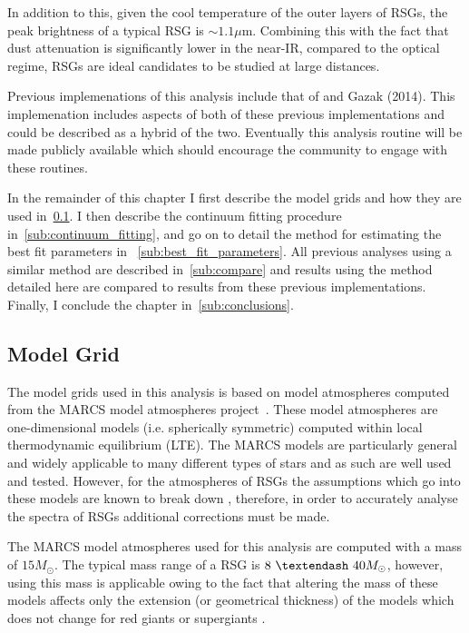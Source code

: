 In addition to this, given the cool temperature of the outer layers of RSGs,
the peak brightness of a typical RSG is $\sim1.1\mu$m.
Combining this with the fact that dust attenuation is significantly lower in the near-IR, compared to the optical regime, RSGs are ideal candidates to be studied at large distances.

Previous implemenations of this analysis include that of
\cite{2010MNRAS.407.1203D} and Gazak (2014).
This implemenation includes aspects of both of these previous implementations and could be described as a hybrid of the two.
Eventually this analysis routine will be made publicly available which should encourage the community to engage with these routines.

In the remainder of this chapter I first describe the model grids and how they are used in~\ref{sub:model_grid}.
I then describe the continuum fitting procedure in~\ref{sub:continuum_fitting},
and go on to detail the method for estimating the best fit parameters in
~\ref{sub:best_fit_parameters}.
All previous analyses using a similar method are described in~\ref{sub:compare}
and results using the method detailed here are compared to results from these previous implementations.
Finally, I conclude the chapter in~\ref{sub:conclusions}.


\subsection{Model Grid} %
\label{sub:model_grid}
The model grids used in this analysis is based on model atmospheres computed from the
MARCS model atmospheres project~\citep{2008A&A...486..951G}.
These model atmospheres are one-dimensional models (i.e. spherically symmetric)
computed within local thermodynamic equilibrium (LTE).
The MARCS models are particularly general and widely applicable to many different types of stars and as such are well used and tested.
However, for the atmospheres of RSGs the assumptions which go into these models are known to break down
\citep{2002AN....323..213F,2010ASPC..425..124P},
therefore, in order to accurately analyse the spectra of RSGs additional corrections must be made.

The MARCS model atmospheres used for this analysis are computed with a mass of $15M_{\odot}$.
The typical mass range of a RSG is $8~\textendash~40M_{\odot}$, however,
using this mass is applicable owing to the fact that altering the mass of these models affects only the extension
(or geometrical thickness) of the models which does not change for red giants or supergiants
\citep{2010MNRAS.407.1203D}.


